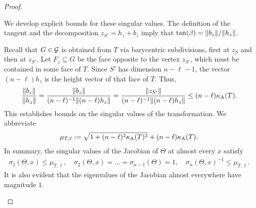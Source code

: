 \documentclass[10pt,a4paper]{article}
\begin{document}
\begin{proof}
\begin{itemize}
        We develop explicit bounds for these singular values. 
        The definition of the tangent and the decomposition $z_{S'} = h_{z} + b_{z}$ 
        imply that $\tan(\beta) = \|  b_{z}  \| / \|  h_{z}  \|$.
        
        Recall that $G \in {\mathcal G}$ is obtained from $T$ via barycentric subdivisions, first at $z_{S}$ and then at $z_{S'}$. 
        Let $F_{z} \subseteq G$ be the face opposite to the vertex $z_{S'}$,
        which must be contained in some face of $T$. 
        Since $S'$ has dimension $n-\ell-1$, the vector $(n-\ell) h_{z}$ is the height vector of that face of $T$. 
        Thus, 
        \begin{align*}
            \frac{ \|  b_{z}  \| }{ \|  h_{z}  \| }
            = 
            \frac{ \|  b_{z}  \| }{ (n-\ell)^{-1} \| (n-\ell) h_{z} \| }
            = 
            \frac{ \|  z_{S'}  \| }{ (n-\ell)^{-1} \| (n-\ell) h_{z} \| }
            \leq 
            (n-\ell) \kappa_{\rm A}(T)
            .
        \end{align*}
        This establishes bounds on the singular values of the transformation. 
        We abbreviate 
        \begin{align}\label{math:upper_bound_for_theta}
            \mu_{T,\ell} 
            := 
            \sqrt{ 
                1 + (n-\ell)^{2} \aspectratio(T)^{2} %
            } 
            + 
            (n-\ell) \aspectratio(T) %
            .
        \end{align}
        In summary, the singular values of the Jacobian of $\Theta$ at almost every $x$ satisfy 
        \begin{align}
            \sigma_{1}(\Theta,x) \leq \mu_{T,\ell},
            \quad 
            \sigma_{2}(\Theta,x) = \dots = \sigma_{n-1}(\Theta) = 1,
            \quad 
            \sigma_{n}(\Theta,x)^{-1} \leq \mu_{T,\ell}.
        \end{align}
        \color{red}It is also evident that the eigenvalues of the Jacobian almost everywhere have magnitude $1$.\color{black}
        

\end{itemize}
\end{proof}
\end{document}

